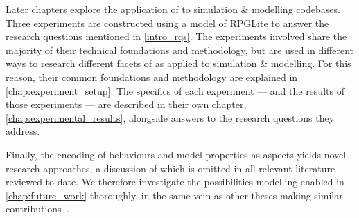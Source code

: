 Later chapters explore the application of \aop{} to simulation \& modelling
codebases. Three experiments are constructed using a model of RPGLite to answer
the research questions mentioned in \cref{intro_rqs}. The experiments involved
share the majority of their technical foundations and methodology, but are used
in different ways to research different facets of \aop{} as applied to
simulation \& modelling. For this reason, their common foundations and
methodology are explained in \cref{chap:experiment_setup}. The specifics of each
experiment --- and the results of those experiments --- are described in their
own chapter, \cref{chap:experimental_results}, alongside answers to the research
questions they address.

Finally, the encoding of behaviours and model properties as aspects yields novel
research approaches, a discussion of which is omitted in all relevant literature
reviewed to date. We therefore investigate the possibilities \aspectoriented{}
modelling enabled in \cref{chap:future_work} thoroughly, in the same vein as
other theses making similar contributions~\cite{marsh1994formalising}.







